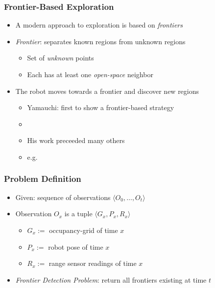 \begin{frame}
\frametitle{Frontier-Based Exploration}
\begin{itemize}
  \item A modern approach to exploration is based on \emph{frontiers}
  \item \emph{Frontier}: separates known regions from unknown regions 
  	\begin{itemize} 
		\item Set of \emph{unknown} points 
		\item Each has at least one \emph{open-space} neighbor
  	\end{itemize} \pause
  \item The robot moves towards a frontier and discover new regions 
  \begin{itemize}
  	  \item Yamauchi: first to show a frontier-based strategy
  	  \item \citep{yamauchi_frontier-based_1997,yamauchi_frontier-based_1998}
  	  \item His work preceeded many others 
  	  \item e.g.
  	  \citep{burgard05tro,lau_behavioural_2003,sawhney_fast_2009}%
  \end{itemize}
\end{itemize}
\end{frame}

\begin{frame}
\frametitle{Problem Definition}
\begin{itemize}
  \item Given: sequence of observations $\langle O_0,\ldots,O_t\rangle$
  \item Observation $O_x$ is a tuple $\langle G_x, P_x, R_x\rangle$
  \begin{itemize}
	  \item $G_x:=$ occupancy-grid of time $x$
	  \item $P_x:=$ robot pose of time $x$
	  \item $R_x:=$ range sensor readings of time $x$
  \end{itemize}
  \item \emph{Frontier Detection Problem}: return all frontiers existing at
  time $t$
\end{itemize}
\end{frame}

